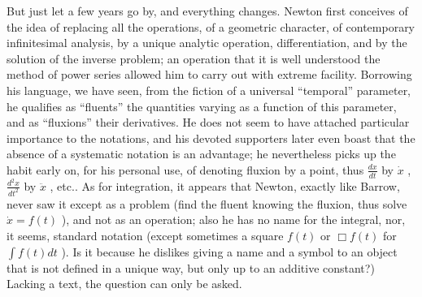 But just let a few years go by, and everything changes. Newton first conceives of the idea of replacing all the operations, of a geometric character, of contemporary infinitesimal analysis, by a unique analytic operation, differentiation, and by the solution of the inverse problem; an operation that it is well understood the method of power series allowed him to carry out with extreme facility. Borrowing his language, we have seen, from the fiction of a universal ``temporal'' parameter, he qualifies as ``fluents'' the quantities varying as a function of this parameter, and as ``fluxions'' their derivatives. He does not seem to have attached particular importance to the notations, and his devoted supporters later even boast that the absence of a systematic notation is an advantage; he nevertheless picks up the habit early on, for his personal use, of denoting fluxion by a point, thus \(\frac{dx}{dt}\) by \(\dot{x}\) , \(\frac{d^{2}x}{dt^{2}}\) by \(\ddot{x}\) , etc.. As for integration, it appears that Newton, exactly like Barrow, never saw it except as a problem (find the fluent knowing the fluxion, thus solve \(\dot{x}=f(t)\) ), and not as an operation; also he has no name for the integral, nor, it seems, standard notation (except sometimes a square \(\boxed{f(t)}\) or \(\Box f(t)\) for \(\int f(t)dt\) ). Is it because he dislikes giving a name and a symbol to an object that is not defined in a unique way, but only up to an additive constant?) Lacking a text, the question can only be asked.


